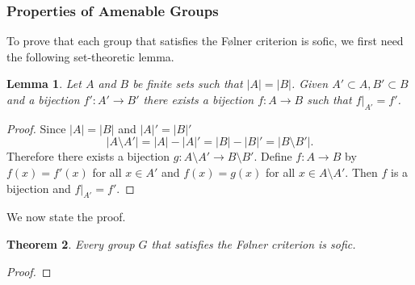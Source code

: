 \documentclass[titlepage, a4paper]{article}
\newcommand{\card}[1]{\left| #1 \right|}
\newtheorem{theorem}{Theorem}[section]
\newtheorem{lemma}[theorem]{Lemma}
\theoremstyle{remark}
\begin{document}
\subsubsection{Properties of Amenable Groups}

To prove that each group that satisfies the Følner criterion is sofic, we first need the following set-theoretic lemma.

\begin{lemma}\label{lem:finite_bijections} 
        Let $A$ and $B$ be finite sets such that $|A| = |B|$. Given $A' \subset A, B' \subset B$ and a bijection $f': A' \to B'$ there exists a bijection $f: A \to B$ such that $f|_{A'} = f'$. 
    \end{lemma}
    \begin{proof}
        Since $\card A = \card B$ and $\card A' = \card B'$
        \[
        \card{A \setminus A'} = \card A - \card A' = \card B - \card B' = \card{B \setminus B'}.
        \]
        Therefore there exists a bijection $g: A \setminus A' \to B \setminus B'$. Define $f: A  \to B$ by $f(x) = f'(x)$ for all $x \in A'$ and $f(x)=g(x)$ for all $x \in A \setminus A'$. Then $f$ is a bijection and $f|_{A'} = f'$.
    \end{proof}

We now state the proof.

 	\begin{theorem}\label{thm:folner_sofic}
        Every group $G$ that satisfies the Følner criterion is sofic.
    \end{theorem}
    \begin{proof}
        
 	\end{proof}
\end{document}
